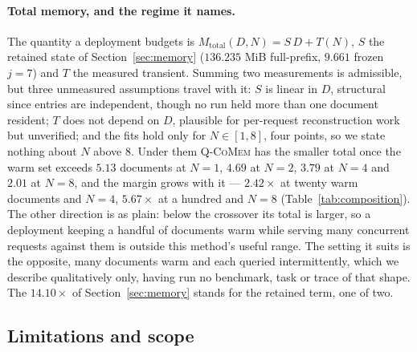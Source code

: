 \documentclass{article}
\newcommand{\qcomem}{\textsc{Q-CoMem}}
\begin{document}
\paragraph{Total memory, and the regime it names.}
The quantity a deployment budgets is $M_{\mathrm{total}}(D,N)=S\,D+T(N)$, $S$
the retained state of Section~\ref{sec:memory} ($136.235$ MiB full-prefix,
$9.661$ frozen $j=7$) and $T$ the measured transient.  Summing two measurements is
admissible, but three unmeasured assumptions travel with it: $S$ is
linear in $D$, structural since entries are independent, though no run held more
than one document resident; $T$ does not depend on $D$, plausible for per-request
reconstruction work but unverified; and the fits hold only for
$N\in[1,8]$, four points, so we state nothing about $N$ above $8$.  Under them
\qcomem{} has the smaller total once the warm set exceeds $5.13$ documents at
$N=1$, $4.69$ at $N=2$, $3.79$ at $N=4$ and $2.01$ at $N=8$, and the margin grows
with it --- $2.42\times$ at twenty warm documents and $N=4$, $5.67\times$ at a
hundred and $N=8$ (Table~\ref{tab:composition}).  The other direction is as
plain: below the crossover its total is larger, so a deployment keeping a handful
of documents warm while serving many concurrent requests against them is outside
this method's useful range.  The setting it suits is the opposite, many documents
warm and each queried intermittently, which we describe qualitatively only,
having run no benchmark, task or trace of that shape.  The $14.10\times$ of
Section~\ref{sec:memory} stands for the retained term, one of two.

\subsection{Limitations and scope}
\label{sec:limitations}
\end{document}
